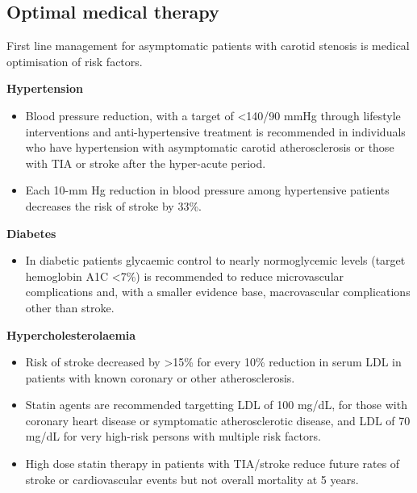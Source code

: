 \documentclass[
]{book}
\providecommand{\tightlist}{%
  \setlength{\itemsep}{0pt}\setlength{\parskip}{0pt}}
\begin{document}
\hypertarget{optimal-medical-therapy}{%
\subsection{Optimal medical therapy}\label{optimal-medical-therapy}}

First line management for asymptomatic patients with carotid stenosis is
medical optimisation of risk factors.

\textbf{Hypertension}

\begin{itemize}
\item
  Blood pressure reduction, with a target of \textless140/90 mmHg through
  lifestyle interventions and anti-hypertensive treatment is
  recommended in individuals who have hypertension with asymptomatic
  carotid atherosclerosis or those with TIA or stroke after the
  hyper-acute period.
\item
  Each 10-mm Hg reduction in blood pressure among hypertensive
  patients decreases the risk of stroke by 33\%.
\end{itemize}

\textbf{Diabetes}

\begin{itemize}
\tightlist
\item
  In diabetic patients glycaemic control to nearly normoglycemic
  levels (target hemoglobin A1C \textless7\%) is recommended to reduce
  microvascular complications and, with a smaller evidence base,
  macrovascular complications other than stroke.
\end{itemize}

\textbf{Hypercholesterolaemia}

\begin{itemize}
\item
  Risk of stroke decreased by \textgreater15\% for every 10\% reduction in serum
  LDL in patients with known coronary or other atherosclerosis.
\item
  Statin agents are recommended targetting LDL of 100 mg/dL, for those
  with coronary heart disease or symptomatic atherosclerotic disease,
  and LDL of 70 mg/dL for very high-risk persons with multiple risk
  factors.
\item
  High dose statin therapy in patients with TIA/stroke reduce future
  rates of stroke or cardiovascular events but not overall mortality
  at 5 years. \citep{karamHighDoseAtorvastatinStroke2008}
\end{itemize}
\end{document}
